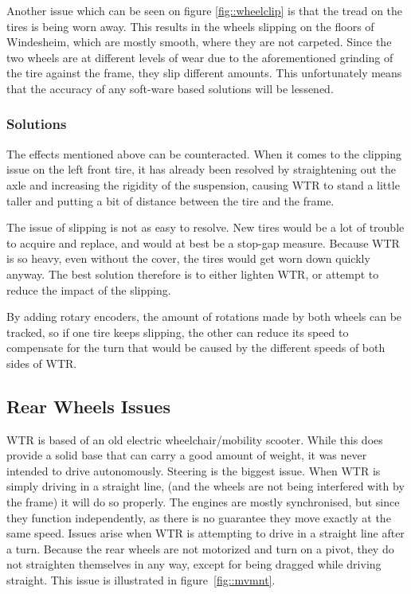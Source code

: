 Another issue which can be seen on figure \ref{fig::wheelclip} is that the tread on the tires is being worn away.
This results in the wheels slipping on the floors of Windesheim, which are mostly smooth, where they are not carpeted.
Since the two wheels are at different levels of wear due to the aforementioned grinding of the tire against the frame, they slip different amounts.
This unfortunately means that the accuracy of any soft-ware based solutions will be lessened.

\subsubsection{Solutions}
The effects mentioned above can be counteracted.
When it comes to the clipping issue on the left front tire, it has already been resolved by straightening out the axle and increasing the rigidity of the suspension, causing WTR to stand a little taller and putting a bit of distance between the tire and the frame.

The issue of slipping is not as easy to resolve.
New tires would be a lot of trouble to acquire and replace, and would at best be a stop-gap measure.
Because WTR is so heavy, even without the cover, the tires would get worn down quickly anyway.
The best solution therefore is to either lighten WTR, or attempt to reduce the impact of the slipping.

By adding rotary encoders, the amount of rotations made by both wheels can be tracked, so if one tire keeps slipping, the other can reduce its speed to compensate for the turn that would be caused by the different speeds of both sides of WTR.


\subsection{Rear Wheels Issues}
WTR is based of an old electric wheelchair/mobility scooter.
While this does provide a solid base that can carry a good amount of weight, it was never intended to drive autonomously.
Steering is the biggest issue.
When WTR is simply driving in a straight line, (and the wheels are not being interfered with by the frame) it will do so properly.
The engines are mostly synchronised, but since they function independently, as there is no guarantee they move exactly at the same speed.
Issues arise when WTR is attempting to drive in a straight line after a turn.
Because the rear wheels are not motorized and turn on a pivot, they do not straighten themselves in any way, except for being dragged while driving straight.
This issue is illustrated in figure~\ref{fig::mvmnt}.

